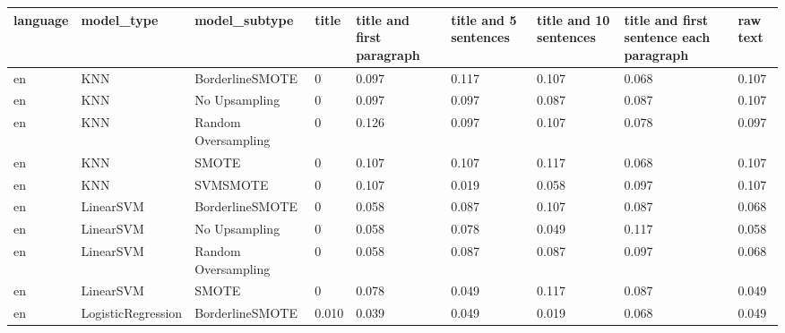\begin{tabular}{lllllllll}
\toprule
language &                   model\_type &       model\_subtype & title & title and first paragraph & title and 5 sentences & title and 10 sentences & title and first sentence each paragraph &  raw text \\
\midrule
      en &                          KNN &     BorderlineSMOTE &     0 &                     0.097 &                 0.117 &                  0.107 &                                   0.068 &     0.107 \\
      en &                          KNN &       No Upsampling &     0 &                     0.097 &                 0.097 &                  0.087 &                                   0.087 &     0.107 \\
      en &                          KNN & Random Oversampling &     0 &                     0.126 &                 0.097 &                  0.107 &                                   0.078 &     0.097 \\
      en &                          KNN &               SMOTE &     0 &                     0.107 &                 0.107 &                  0.117 &                                   0.068 &     0.107 \\
      en &                          KNN &            SVMSMOTE &     0 &                     0.107 &                 0.019 &                  0.058 &                                   0.097 &     0.107 \\
      en &                    LinearSVM &     BorderlineSMOTE &     0 &                     0.058 &                 0.087 &                  0.107 &                                   0.087 &     0.068 \\
      en &                    LinearSVM &       No Upsampling &     0 &                     0.058 &                 0.078 &                  0.049 &                                   0.117 &     0.058 \\
      en &                    LinearSVM & Random Oversampling &     0 &                     0.058 &                 0.087 &                  0.087 &                                   0.097 &     0.068 \\
      en &                    LinearSVM &               SMOTE &     0 &                     0.078 &                 0.049 &                  0.117 &                                   0.087 &     0.049 \\
      en &           LogisticRegression &     BorderlineSMOTE & 0.010 &                     0.039 &                 0.049 &                  0.019 &                                   0.068 &     0.049 \\

\end{tabular}
